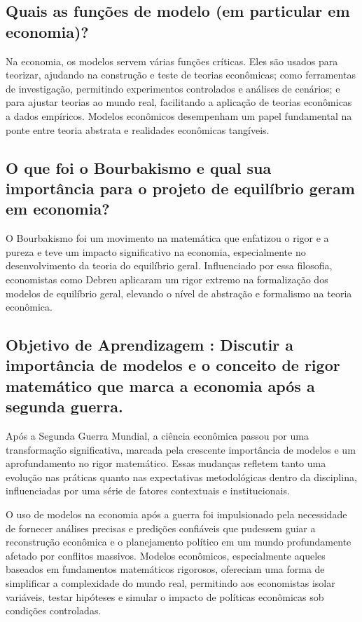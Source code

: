 \documentclass[a4paper,12pt]{article}[abntex2]
\begin{document}
\subsection{\textbf{Quais as funções de modelo (em particular em economia)?}}
Na economia, os modelos servem várias funções críticas. Eles são usados para teorizar, ajudando na construção e teste de teorias econômicas; como ferramentas de investigação, permitindo experimentos controlados e análises de cenários; e para ajustar teorias ao mundo real, facilitando a aplicação de teorias econômicas a dados empíricos. Modelos econômicos desempenham um papel fundamental na ponte entre teoria abstrata e realidades econômicas tangíveis.

\subsection{\textbf{O que foi o Bourbakismo e qual sua importância para o projeto de equilíbrio geram em economia?}}
O Bourbakismo foi um movimento na matemática que enfatizou o rigor e a pureza e teve um impacto significativo na economia, especialmente no desenvolvimento da teoria do equilíbrio geral. Influenciado por essa filosofia, economistas como Debreu aplicaram um rigor extremo na formalização dos modelos de equilíbrio geral, elevando o nível de abstração e formalismo na teoria econômica.

\subsection{\textbf{Objetivo de Aprendizagem : Discutir a importância de modelos e o conceito de rigor matemático que marca a economia após a segunda guerra.}}
Após a Segunda Guerra Mundial, a ciência econômica passou por uma transformação significativa, marcada pela crescente importância de modelos e um aprofundamento no rigor matemático. Essas mudanças refletem tanto uma evolução nas práticas quanto nas expectativas metodológicas dentro da disciplina, influenciadas por uma série de fatores contextuais e institucionais.

O uso de modelos na economia após a guerra foi impulsionado pela necessidade de fornecer análises precisas e predições confiáveis que pudessem guiar a reconstrução econômica e o planejamento político em um mundo profundamente afetado por conflitos massivos. Modelos econômicos, especialmente aqueles baseados em fundamentos matemáticos rigorosos, ofereciam uma forma de simplificar a complexidade do mundo real, permitindo aos economistas isolar variáveis, testar hipóteses e simular o impacto de políticas econômicas sob condições controladas.
\end{document}

